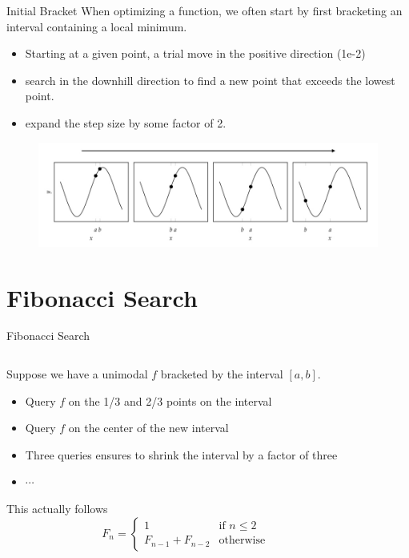 \documentclass{beamer}
\begin{document}
\begin{frame}{Initial Bracket}
When optimizing a function, we often start by first bracketing an interval containing a local minimum.
\begin{itemize}
    \item Starting at a given point, a trial move in the positive direction (1e-2) 
    \item search in the downhill direction to find a new point that exceeds the lowest point. 
    \item expand the step size by some factor of 2. 
\end{itemize}
\begin{figure}
\centering
\includegraphics[width=120mm]{Figs/bracket.jpeg}
\end{figure}
\end{frame}


\section{Fibonacci Search}
\begin{frame}{Fibonacci Search}
\begin{columns}
\begin{column}{.6\textwidth}
Suppose we have a unimodal $f$ bracketed by the interval $[a, b]$.
\begin{itemize}
    \item Query $f$ on the 1/3 and 2/3 points on the interval
    \item Query $f$ on the center of the new interval
    \item Three queries ensures to shrink the interval by a factor of three
    \item $\cdots$
\end{itemize}
   
This actually follows %
\begin{equation*}
F_n = 
    \begin{cases}
    1 & \textrm{if~} n\leq 2\\
    F_{n-1} + F_{n-2} & \textrm{otherwise}
    \end{cases}
\end{equation*}

\end{column}

\begin{column}{.4\textwidth}
\end{column}

\end{columns}
\end{frame}
\end{document}
